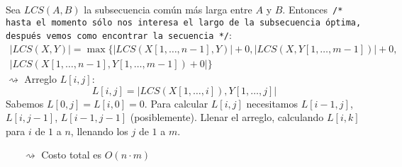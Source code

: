 \documentclass[english, spanish, fleqn, 10pt]{article}
\newcommand{\comentarioc}[1]{\texttt{\textcolor{webred}{/* #1 */}}}
\numberwithin{equation}{section}
\newcommand{\nparentesis}[1]{\left( #1 \right)}
\newcommand{\nabsoluto}[1]{\left| #1 \right|}
\newcommand{\ncorchetes}[1]{\left[ #1 \right]}
\theoremstyle{definition}
\begin{document}
Sea $LCS\nparentesis{A, B}$ la subsecuencia común más larga entre $A$ y $B$. Entonces \comentarioc{hasta el momento sólo nos interesa el largo de la subsecuencia óptima, después vemos como encontrar la secuencia}:
\begin{align*}
\nabsoluto{LCS\nparentesis{X, Y}}=\max\{\nabsoluto{LCS\nparentesis{X\ncorchetes{1, \ldots, n-1}, Y}}+0, \nabsoluto{LCS\nparentesis{X, Y\ncorchetes{1, \ldots, m-1}}}+0,\\
 \nabsoluto{LCS\nparentesis{X\ncorchetes{1, \ldots, n-1}, Y\ncorchetes{1, \ldots, m-1}}+0}\}
\end{align*}
$\rightsquigarrow$ Arreglo $L\ncorchetes{i, j}$:
\begin{equation}
L\ncorchetes{i, j}=\nabsoluto{LCS\nparentesis{X\ncorchetes{1, \ldots, i}}, Y\ncorchetes{1, \ldots, j}}
\end{equation}
Sabemos $L\ncorchetes{0, j}=L\ncorchetes{i, 0}=0$. Para calcular $L\ncorchetes{i, j}$ necesitamos $L\ncorchetes{i-1, j}$, $L\ncorchetes{i, j-1}$, $L\ncorchetes{i-1, j-1}$ (posiblemente). Llenar el arreglo, calculando $L\ncorchetes{i, k}$ para $i$ de $1$ a $n$, llenando los $j$ de $1$ a $m$.
\begin{itemize}
	\item [$\rightsquigarrow$] Costo total es $O\nparentesis{n\cdot m}$
\end{itemize}
\end{document}
